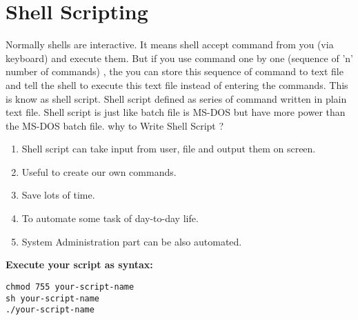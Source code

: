 \section{Shell Scripting}
Normally shells are interactive. It means shell accept command from you (via keyboard) and execute them. But if you use command one by one (sequence of 'n' number of commands) , the you can store this sequence of command to text file and tell the shell to execute this text file instead of entering the commands. This is know as shell script.
Shell script defined as series of command written in plain text file. Shell script is just like batch file is MS-DOS but have more power than the MS-DOS batch file.
why to Write Shell Script ?
\begin{enumerate} 
\item Shell script can take input from user, file and output them on screen.
\item Useful to create our own commands.
\item Save lots of time.
\item To automate some task of day-to-day life.
\item System Administration part can be also automated.
\end{enumerate} 
{ \bf Execute your script as syntax:}
\begin{verbatim}
chmod 755 your-script-name
sh your-script-name
./your-script-name
\end{verbatim}

